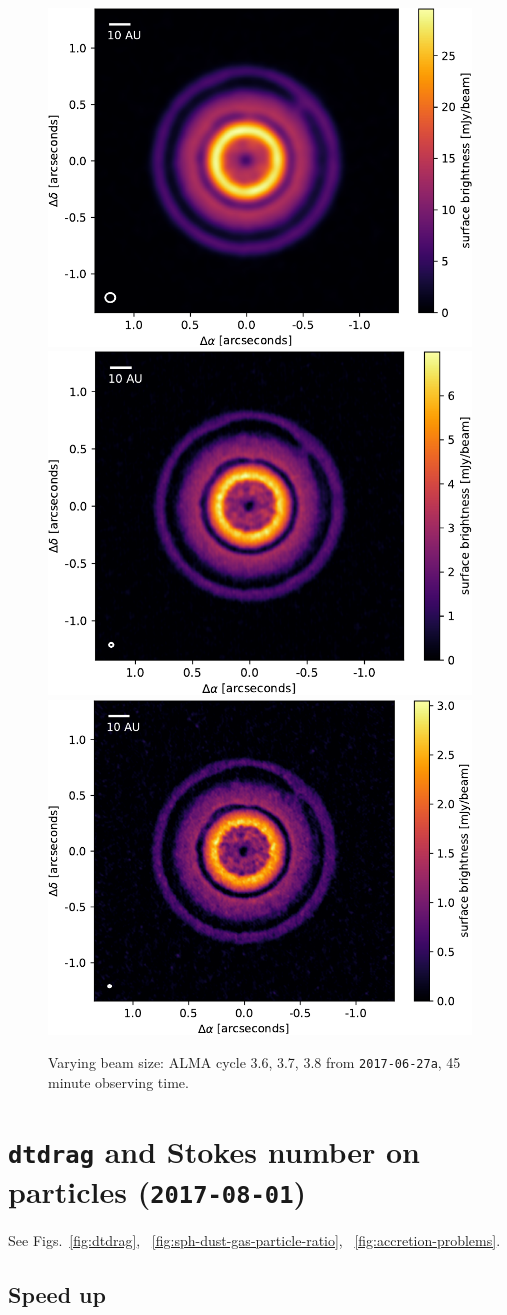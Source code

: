 \documentclass[usenatbib,a4paper,times,fleqn]{mnras}
\begin{document}
\begin{figure}
   \begin{center}
      \includegraphics[width=0.32\columnwidth]{figs/cycle3.6.pdf}
      \includegraphics[width=0.32\columnwidth]{figs/cycle3.7.pdf}
      \includegraphics[width=0.32\columnwidth]{figs/cycle3.8.pdf}
      \caption{Varying beam size: ALMA cycle 3.6, 3.7, 3.8 from
         \texttt{2017-06-27a}, 45 minute observing time.}
      \label{fig:beam-size}
   \end{center}
\end{figure}


\section*{\texttt{dtdrag} and Stokes number on particles (\texttt{2017-08-01})}

See Figs.~\ref{fig:dtdrag}, ~\ref{fig:sph-dust-gas-particle-ratio},
~\ref{fig:accretion-problems}.


\subsection*{Speed up}
\end{document}
